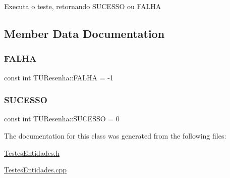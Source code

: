 Executa o teste, retornando S\+U\+C\+E\+S\+SO ou F\+A\+L\+HA 

\subsection{Member Data Documentation}
\mbox{\label{class_t_u_resenha_a947f43cb8d4384ab279d9884232dc5f7}} 
\subsubsection{\texorpdfstring{F\+A\+L\+HA}{FALHA}}
{\footnotesize\ttfamily const int T\+U\+Resenha\+::\+F\+A\+L\+HA = -\/1\hspace{0.3cm}{\ttfamily [static]}}

\mbox{\label{class_t_u_resenha_a851535b308f0a5a46a465fc428128ea0}} 
\subsubsection{\texorpdfstring{S\+U\+C\+E\+S\+SO}{SUCESSO}}
{\footnotesize\ttfamily const int T\+U\+Resenha\+::\+S\+U\+C\+E\+S\+SO = 0\hspace{0.3cm}{\ttfamily [static]}}



The documentation for this class was generated from the following files\+:\begin{DoxyCompactItemize}
\item 
\hyperlink{_testes_entidades_8h}{Testes\+Entidades.\+h}\item 
\hyperlink{_testes_entidades_8cpp}{Testes\+Entidades.\+cpp}\end{DoxyCompactItemize}
